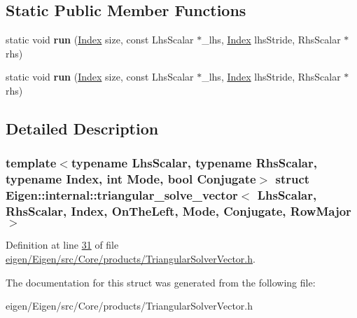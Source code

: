 \subsection*{Static Public Member Functions}
\begin{DoxyCompactItemize}
\item 
\mbox{\label{struct_eigen_1_1internal_1_1triangular__solve__vector_3_01_lhs_scalar_00_01_rhs_scalar_00_01_ind05791747bf7342daa3286389f182e45b_a076e86f3709acd78edb5fa1534ab8909}} 
static void {\bfseries run} (\hyperlink{namespace_eigen_a62e77e0933482dafde8fe197d9a2cfde}{Index} size, const Lhs\+Scalar $\ast$\+\_\+lhs, \hyperlink{namespace_eigen_a62e77e0933482dafde8fe197d9a2cfde}{Index} lhs\+Stride, Rhs\+Scalar $\ast$rhs)
\item 
\mbox{\label{struct_eigen_1_1internal_1_1triangular__solve__vector_3_01_lhs_scalar_00_01_rhs_scalar_00_01_ind05791747bf7342daa3286389f182e45b_a076e86f3709acd78edb5fa1534ab8909}} 
static void {\bfseries run} (\hyperlink{namespace_eigen_a62e77e0933482dafde8fe197d9a2cfde}{Index} size, const Lhs\+Scalar $\ast$\+\_\+lhs, \hyperlink{namespace_eigen_a62e77e0933482dafde8fe197d9a2cfde}{Index} lhs\+Stride, Rhs\+Scalar $\ast$rhs)
\end{DoxyCompactItemize}


\subsection{Detailed Description}
\subsubsection*{template$<$typename Lhs\+Scalar, typename Rhs\+Scalar, typename Index, int Mode, bool Conjugate$>$\newline
struct Eigen\+::internal\+::triangular\+\_\+solve\+\_\+vector$<$ Lhs\+Scalar, Rhs\+Scalar, Index, On\+The\+Left, Mode, Conjugate, Row\+Major $>$}



Definition at line \hyperlink{eigen_2_eigen_2src_2_core_2products_2_triangular_solver_vector_8h_source_l00031}{31} of file \hyperlink{eigen_2_eigen_2src_2_core_2products_2_triangular_solver_vector_8h_source}{eigen/\+Eigen/src/\+Core/products/\+Triangular\+Solver\+Vector.\+h}.



The documentation for this struct was generated from the following file\+:\begin{DoxyCompactItemize}
\item 
eigen/\+Eigen/src/\+Core/products/\+Triangular\+Solver\+Vector.\+h\end{DoxyCompactItemize}
